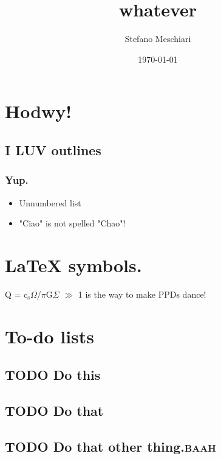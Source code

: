 \documentclass[11pt]{article}
\author{Stefano Meschiari}
\date{\today}
\title{whatever}
\begin{document}
\maketitle
\tableofcontents

\section{Hodwy!}
\label{sec-1}
\subsection{I LUV outlines}
\label{sec-1-1}
\subsubsection{Yup.}
\label{sec-1-1-1}
\begin{itemize}
\item Unnumbered list
\item "Ciao" is not spelled "Chao"!
\end{itemize}

\section{\LaTeX{} symbols.}
\label{sec-2}
Q = c$_{\text{s}}$$\Omega$/$\pi$G$\Sigma$ $\gg$ 1 is the way to make PPDs dance!

\section{To-do lists}
\label{sec-3}
\subsection{{\bfseries\sffamily TODO} Do this}
\label{sec-3-1}
\subsection{{\bfseries\sffamily TODO} Do that}
\label{sec-3-2}
\subsection{{\bfseries\sffamily TODO} Do that other thing.\hfill{}\textsc{baah}}
\label{sec-3-3}
\end{document}
